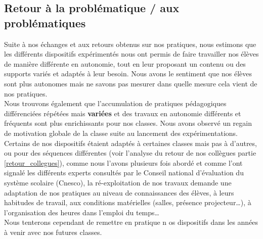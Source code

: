 \subsection{Retour à la problématique / aux problématiques}
Suite à nos échanges et aux retours obtenus sur nos pratiques, nous estimons que les différents dispositifs expérimentés nous ont permis de faire travailler nos élèves de manière différente en autonomie, tout en leur proposant un contenu ou des supports variés et adaptés à leur besoin. Nous avons le sentiment que nos élèves sont plus autonomes mais ne savons pas mesurer dans quelle mesure cela vient de nos pratiques.\\
Nous trouvons également que l'accumulation de pratiques pédagogiques différenciées répétées mais \textbf{variées} et des travaux en autonomie différents et fréquents sont plus enrichissants pour nos classes. Nous avons observé un regain de motivation globale de la classe suite au lancement des expérimentations.\\
Certains de nos dispositifs étaient adaptés à certaines classes mais pas à d'autres, ou pour des séquences différentes (voir l'analyse du retour de nos collègues partie \ref{retour_collegues}), comme nous l'avons plusieurs fois abordé et comme l'ont signalé les différents experts consultés par le Conseil national d'évaluation du système scolaire (Cnesco)\cite{cnesco_synthese}\cite{cnesco_notes_experts}, la ré-exploitation de nos travaux demande une adaptation de nos pratiques au niveau de connaissances des élèves, à leurs habitudes de travail, aux conditions matérielles (salles, présence projecteur\ldots),  à l'organisation des heures dans l'emploi du temps\ldots\\
Nous tenterons cependant de remettre en pratique n os dispositifs dans les années à venir avec nos futures classes.
